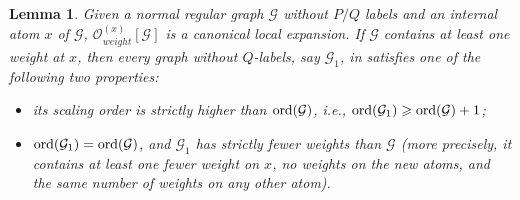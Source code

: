 \documentclass{article}
\newcommand{\1}{\mathds{1}}
\numberwithin{equation}{section}
\newcommand{\ord}{{\rm{ord}}}
\newcommand{\be}{\begin{equation}}
\newcommand{\ee}{\end{equation}}
\renewcommand{\cal}{\mathcal}
\renewcommand{\geq}{\geqslant}
\renewcommand{\ge}{\geq}
\theoremstyle{plain} %
\newtheorem{lemma}[theorem]{Lemma}
\theoremstyle{remark}
\newcommand{\cor}{\color{red}}
\newcommand{\hty}[1]{{\cor (ht: #1) }}
\begin{document}
  \begin{lemma}\label{expandlabel}
Given a normal regular graph $ \cal G$ without $P/Q$ labels and an internal atom $x$ of $\cal G$, $ {\cal O}_{weight}^{(x)}[\cal G]$ is a canonical local expansion. If $\cal G$ contains at least one weight at $x$, then every graph without $Q$-labels, say $\cal G_1$, in \smash{$ {\cal O}_{weight}^{(x)}[\cal G]$} satisfies one of the following two properties:


\begin{itemize}
	\item[(a)] its scaling order is strictly higher than $\ord(\cal G)$, i.e., $\ord(\cal G_1)\ge \ord(\cal G) +1$;
	\item[(b)] %
	$\ord(\cal G_1)= \ord(\cal G)$, and $\cal G_1$ has strictly fewer weights than $\cal G$ (more precisely, it contains at least one fewer weight on $x$, no weights on the new atoms, and the same number of weights on any other atom).
\end{itemize}



\end{lemma}
\end{document}
